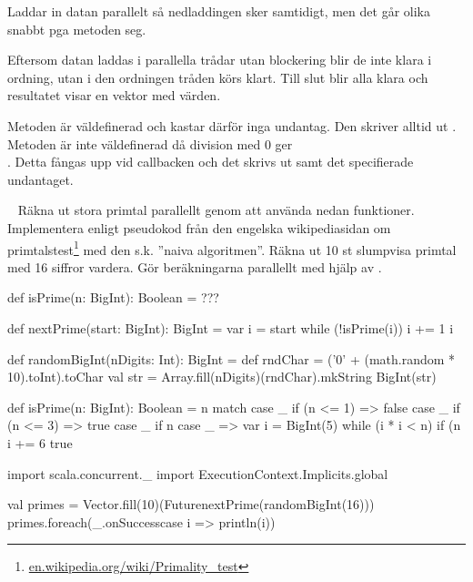 \SubtaskSolved  Laddar in datan parallelt så nedladdingen sker samtidigt, men det går olika snabbt pga metoden seg.

\SubtaskSolved  Eftersom datan laddas i parallella trådar utan blockering blir de inte klara i ordning, utan i den ordningen tråden körs klart. Till slut blir alla klara och resultatet visar en vektor med  värden.

\SubtaskSolved  Metoden  är väldefinerad och kastar därför inga undantag. Den skriver alltid ut \code{:)}. Metoden  är inte väldefinerad då division med 0 ger \\. Detta fångas upp vid callbacken och det skrivs ut \code{:(} samt det specifierade undantaget.

\ExtraTasks %


\QUESTEND






\WHAT{}

\QUESTBEGIN

\Task  \what~ Räkna ut stora primtal parallellt genom att använda nedan funktioner. Implementera  enligt pseudokod från den engelska wikipediasidan om primtalstest\footnote{\href{https://en.wikipedia.org/wiki/Primality_test}{en.wikipedia.org/wiki/Primality\_test}} med den s.k. ''naiva algoritmen''.  Räkna ut 10 st slumpvisa primtal med 16 siffror vardera. Gör beräkningarna parallellt med hjälp av .

\begin{Code}
def isPrime(n: BigInt): Boolean = ???

def nextPrime(start: BigInt): BigInt = {
  var i = start
  while (!isPrime(i)) { i += 1 }
  i
}

def randomBigInt(nDigits: Int): BigInt = {
   def rndChar = ('0' + (math.random * 10).toInt).toChar
   val str = Array.fill(nDigits)(rndChar).mkString
   BigInt(str)
}
\end{Code}

\SOLUTION


\TaskSolved \what

\begin{Code}
def isPrime(n: BigInt): Boolean = n match {
  case _ if (n <= 1) => false
  case _ if (n <= 3) => true
  case _ if n %
  case _ =>
    var i = BigInt(5)
    while (i * i < n) {
      if (n %
      i += 6
    }
    true
}

import scala.concurrent._
import ExecutionContext.Implicits.global

val primes = Vector.fill(10)(Future{nextPrime(randomBigInt(16))})
primes.foreach(_.onSuccess{case i => println(i)})
\end{Code}


